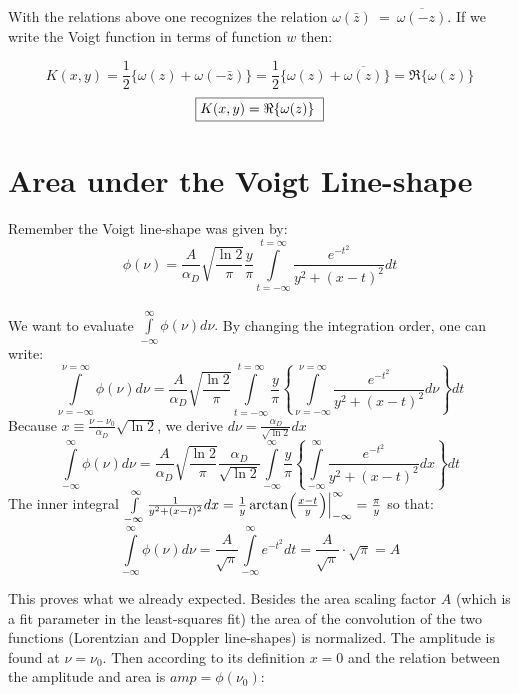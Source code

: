\documentclass[10pt,a4paper]{report}
\begin{document}
\begin{flushleft}
With the relations above one recognizes 
the relation $ \omega( \bar{z}) \ = \ \overline{\omega(-z)} $.
If we write the Voigt function in terms of function $w$ then:


$$
 K(x,y)  = \frac{1}{2} \{ \omega(z) + \omega(- \bar{z} ) \} = 
\frac{1}{2} \{ \omega(z) + \overline{\omega(z)} \} = \Re \{ \omega(z) \}
$$
\begin{equation}
\framebox{$K(x,y) = \Re \{\omega(z)\}$ } 
\end{equation}

\newpage



\section {Area under the Voigt Line-shape}
Remember the Voigt line-shape  was given by:\\
\begin{equation}
\phi (\nu) = \frac {A} {\alpha_D} \sqrt{\frac {\ln 2} {\pi}} \frac {y} {\pi} \int\limits_{t=-\infty}^{t=\infty} \frac {e^{-t^2}} {y^2+(x-t)^2} dt \end{equation}\\

We want to evaluate 
$\int \limits_{-\infty}^{\infty} \phi (\nu) d\nu.$
By changing the integration order, one can write:
$$
\int\limits_{\nu=-\infty}^{\nu=\infty} \phi (\nu) d\nu = \frac {A} {\alpha_D} \sqrt{\frac {\ln 2} {\pi}} \int\limits_{t=-\infty}^{t=\infty} \frac {y} {\pi} \left \{\int\limits_{\nu=-\infty}^{\nu=\infty} \frac {e^{-t^2}} {y^2+(x-t)^2} d\nu \right \} dt
$$
Because $x \equiv \frac {\nu - \nu_0} {\alpha_D} \sqrt{\ln 2}$, we derive $d\nu = \frac {\alpha_D} {\sqrt{\ln2}} dx$
$$
\int\limits_{-\infty}^{\infty} \phi (\nu) d\nu = \frac {A} {\alpha_D} 
\sqrt{\frac {\ln 2} {\pi}}  \frac {\alpha_D} {\sqrt{\ln2}} 
\int\limits_{-\infty}^{\infty} \frac {y} {\pi} 
\left \{ \int\limits_{-\infty}^{\infty} \frac {e^{-t^2}} {y
^2+(x-t)^2} dx \right \} dt
$$
The inner integral $\int\limits_{-\infty}^{\infty} \frac {1} {y^2+(x-t)^2} dx = \frac {1} {y} \arctan \Bigl(\frac {x-t} {y} \Bigr) \Bigr |_{-\infty}^{\infty} = \frac {\pi} {y}$
so that: 
$$
\int\limits_{-\infty}^{\infty} \phi (\nu) d\nu = \frac {A} {\sqrt{\pi}} \int\limits_{-\infty}^{\infty} e^{-t^2} dt 
= {\frac {A} {\sqrt{\pi}} \cdot \sqrt{\pi}}  =  A
$$

This proves what we already expected. Besides the area scaling factor $A$ 
(which is a fit parameter in the least-squares fit) 
the area of the convolution of the two functions 
(Lorentzian and Doppler line-shapes) is normalized.
The amplitude is found at $\nu=\nu_0$. Then according to its definition
$x=0$ and the relation between the amplitude and area is 
$amp=\phi (\nu_0)$:



\end{flushleft}
\end{document}
